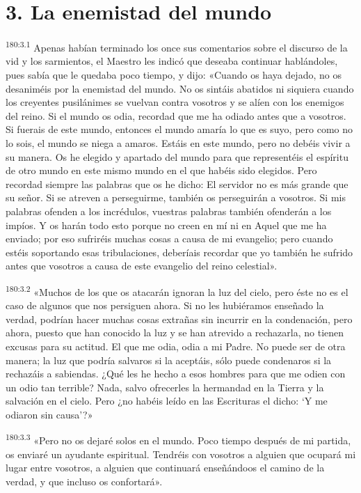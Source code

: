 \section*{3. La enemistad del mundo}
\par 
\textsuperscript{180:3.1} Apenas habían terminado los once sus comentarios sobre el discurso de la vid y los sarmientos, el Maestro les indicó que deseaba continuar hablándoles, pues sabía que le quedaba poco tiempo, y dijo: «Cuando os haya dejado, no os desaniméis por la enemistad del mundo. No os sintáis abatidos ni siquiera cuando los creyentes pusilánimes se vuelvan contra vosotros y se alíen con los enemigos del reino. Si el mundo os odia, recordad que me ha odiado antes que a vosotros. Si fuerais de este mundo, entonces el mundo amaría lo que es suyo, pero como no lo sois, el mundo se niega a amaros. Estáis en este mundo, pero no debéis vivir a su manera. Os he elegido y apartado del mundo para que representéis el espíritu de otro mundo en este mismo mundo en el que habéis sido elegidos. Pero recordad siempre las palabras que os he dicho: El servidor no es más grande que su señor. Si se atreven a perseguirme, también os perseguirán a vosotros. Si mis palabras ofenden a los incrédulos, vuestras palabras también ofenderán a los impíos. Y os harán todo esto porque no creen en mí ni en Aquel que me ha enviado; por eso sufriréis muchas cosas a causa de mi evangelio; pero cuando estéis soportando esas tribulaciones, deberíais recordar que yo también he sufrido antes que vosotros a causa de este evangelio del reino celestial».

\par 
\textsuperscript{180:3.2} «Muchos de los que os atacarán ignoran la luz del cielo, pero éste no es el caso de algunos que nos persiguen ahora. Si no les hubiéramos enseñado la verdad, podrían hacer muchas cosas extrañas sin incurrir en la condenación, pero ahora, puesto que han conocido la luz y se han atrevido a rechazarla, no tienen excusas para su actitud. El que me odia, odia a mi Padre. No puede ser de otra manera; la luz que podría salvaros si la aceptáis, sólo puede condenaros si la rechazáis a sabiendas. ¿Qué les he hecho a esos hombres para que me odien con un odio tan terrible? Nada, salvo ofrecerles la hermandad en la Tierra y la salvación en el cielo. Pero ¿no habéis leído en las Escrituras el dicho: `Y me odiaron sin causa'?»

\par 
\textsuperscript{180:3.3} «Pero no os dejaré solos en el mundo. Poco tiempo después de mi partida, os enviaré un ayudante espiritual. Tendréis con vosotros a alguien que ocupará mi lugar entre vosotros, a alguien que continuará enseñándoos el camino de la verdad, y que incluso os confortará».

